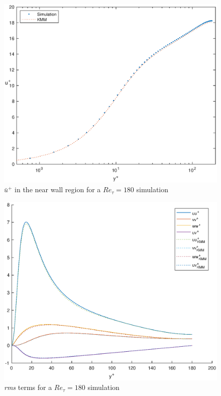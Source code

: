 \begin{figure}
\begin{center}
\includegraphics[scale=0.55]{grafici/loglaw_180.eps}
\caption{$\bar{u}^{+}$ in the near wall region for a $Re_{\tau}=180$ simulation}
\label{loglaw_180}
\end{center} 
\end{figure}
\begin{figure}
\begin{center}
\includegraphics[scale=0.55]{grafici/budget_180.eps}
\caption{\emph{rms} terms for a $Re_{\tau}=180$ simulation}
\label{budget_180}
\end{center} 
\end{figure}



